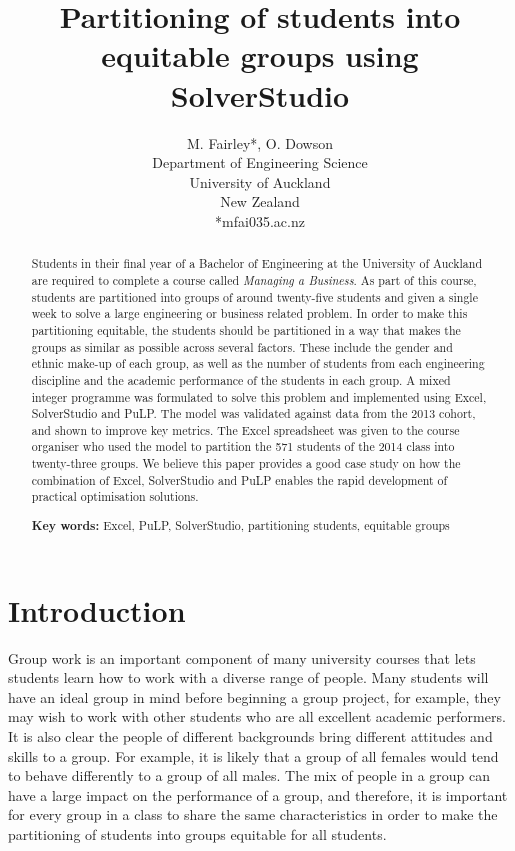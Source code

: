 \documentclass[12pt]{ORSNZ}
\title{Partitioning of students into equitable groups using SolverStudio}
\author{M. Fairley*, O. Dowson\\Department of Engineering Science\\University of
  Auckland\\New Zealand\\{*}mfai035\@@aucklanduni.ac.nz}
\date{} %
\begin{document}
\maketitle
\pagestyle{empty} \thispagestyle{empty}
\begin{abstract}
Students in their final year of a Bachelor of Engineering at the University of Auckland are required to complete a course called \emph{Managing a Business}. As part of this course, students are partitioned into groups of around twenty-five students and given a single week to solve a large engineering or business related problem. In order to make this partitioning equitable, the students should be partitioned in a way that makes the groups as similar as possible across several factors. These include the gender and ethnic make-up of each group, as well as the number of students from each engineering discipline and the academic performance of the students in each group. A mixed integer programme was formulated to solve this problem and implemented using Excel, SolverStudio and PuLP. The model was validated against data from the 2013 cohort, and shown to improve key metrics. The Excel spreadsheet was given to the course organiser who used the model to partition the 571 students of the 2014 class into twenty-three groups. We believe this paper provides a good case study on how the combination of Excel, SolverStudio and PuLP enables the rapid development of practical optimisation solutions.

\textbf{Key words:} Excel, PuLP, SolverStudio, partitioning students, equitable groups
\end{abstract}
\section{Introduction}
Group work is an important component of many university courses that lets students learn how to work with a diverse range of people. Many students will have an ideal group in mind before beginning a group project, for example, they may wish to work with other students who are all excellent academic performers. It is also clear the people of different backgrounds bring different attitudes and skills to a group. For example, it is likely that a group of all females would tend to behave differently to a group of all males. The mix of people in a group can have a large impact on the performance of a group, and therefore, it is important for every group in a class to share the same characteristics in order to make the partitioning of students into groups equitable for all students.
\end{document}
